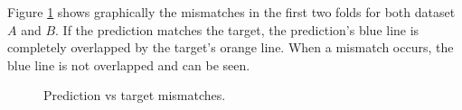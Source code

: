 \documentclass[10pt,a4paper]{article}
\begin{document}
	Figure \ref{fig:samples} shows graphically the mismatches in the first two folds for both dataset $A$ and $B$. If the prediction matches the target, the prediction's blue line is completely overlapped by the target's orange line. When a mismatch occurs, the blue line is not overlapped and can be seen. 
	\begin{figure}
		\centering
		
		
		\caption{Prediction vs target mismatches.}
		\label{fig:samples}
	\end{figure}
\end{document}
